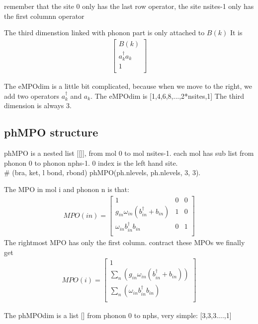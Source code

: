 \documentclass[a4paper,11pt]{ctexart}
\begin{document}
remember that the site 0 only has the last row operator,
the site nsites-1 only has the first columnn operator

The third dimenstion linked with phonon part is only attached to $B(k)$
It is 
\begin{gather}
\begin{bmatrix}
    B(k)  \\
    a^\dagger_k a_k \\
    1 \\
\end{bmatrix}
\end{gather}

The eMPOdim is a little bit complicated, because when we move to the right, we
add two operators $a^\dagger_k$ and $a_k$.
The eMPOdim is [1,4,6,8,...,2*nsites,1]
The third dimension is always 3.

\subsection{phMPO structure}
phMPO is a nested list [[]], from mol 0 to mol nsites-1. each mol has sub list
from phonon 0 to phonon nphs-1. 0 index is the left hand site. \\
\# (bra, ket, l bond, rbond)
phMPO(ph.nlevels, ph.nlevels, 3, 3).

The MPO in mol i and phonon n is that: \\
\begin{gather}
MPO(in) = 
\begin{bmatrix}
    1 & 0 & 0  \\
    g_{in} \omega_{in}(b^\dagger_{in}+b_{in}) & 1 & 0  \\
    \omega_{in} b^\dagger_{in}b_{in} & 0 & 1  \\
\end{bmatrix}
\end{gather}
The rightmost MPO has only the first column.
contract these MPOs we finally get
\begin{gather}
MPO(i) = 
\begin{bmatrix}
    1   \\
    \sum_n (g_{in} \omega_{in}(b^\dagger_{in}+b_{in}))   \\
    \sum_n (\omega_{in} b^\dagger_{in}b_{in})  \\
\end{bmatrix}
\end{gather}

The phMPOdim is a list [] from phonon 0 to nphs,
very simple: [3,3,3....,1]
\end{document}
